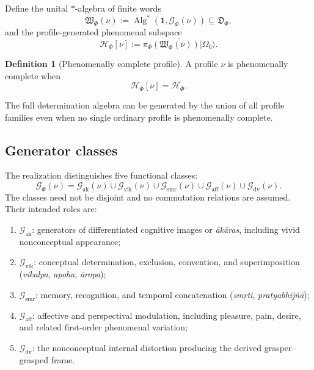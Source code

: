\documentclass[11pt,reqno]{scrartcl}
\newcommand{\scrHF}{\mathscr H_{\Phi}}
\newcommand{\piF}{\pi_{\Phi}}
\newcommand{\idop}{\mathbf 1}
\newcommand{\ket}[1]{\lvert #1\rangle}
\newcommand{\detAlg}{\mathfrak D_{\Phi}}
\newcommand{\vas}{\nu}
\newcommand{\genSet}{\mathcal G_{\Phi}}
\newcommand{\wordSet}{\mathfrak W_{\Phi}}
\newcommand{\Hvas}{\mathscr H_{\Phi}[\nu]}
\newcommand{\Gak}{\mathcal G_{\mathrm{ak}}}
\newcommand{\Gvik}{\mathcal G_{\mathrm{vik}}}
\newcommand{\Gsmr}{\mathcal G_{\mathrm{smr}}}
\newcommand{\Gaff}{\mathcal G_{\mathrm{aff}}}
\newcommand{\Gdv}{\mathcal G_{\mathrm{dv}}}
\DeclareMathOperator{\Alg}{Alg}
\theoremstyle{plain}
\theoremstyle{definition}
\newtheorem{definition}[definition]{Definition}
\theoremstyle{remark}
\begin{document}
Define the unital $*$-algebra of finite words
\begin{equation}
  \wordSet(\vas)
  :=\Alg^*\!\left(
      \idop,\genSet(\vas)
    \right)
  \subseteq\detAlg,
  \label{eq:vasana-word-algebra}
\end{equation}
and the profile-generated phenomenal subspace
\begin{equation}
  \boxed{
  \Hvas
  :=\overline{\piF(\wordSet(\vas))\ket{\Omega_0}}.}
  \label{eq:profile-generated-phenomenal-subspace}
\end{equation}

\begin{definition}[Phenomenally complete profile]
\label{def:phenomenally-complete-profile}
A profile $\vas$ is phenomenally complete when
\begin{equation}
  \Hvas=\scrHF.
  \label{eq:profile-completeness}
\end{equation}
\end{definition}

The full determination algebra can be generated by the union of all profile
families even when no single ordinary profile is phenomenally complete.

\subsection{Generator classes}

The realization distinguishes five functional classes:
\begin{equation}
  \boxed{
  \genSet(\vas)
  =\Gak(\vas)
   \cup\Gvik(\vas)
   \cup\Gsmr(\vas)
   \cup\Gaff(\vas)
   \cup\Gdv(\vas).}
  \label{eq:five-generator-classes}
\end{equation}
The classes need not be disjoint and no commutation relations are assumed.
Their intended roles are:
\begin{enumerate}[label=(\roman*)]
  \item $\Gak$: generators of differentiated cognitive images or
  \emph{\=ak\=aras}, including vivid nonconceptual appearance;
  \item $\Gvik$: conceptual determination, exclusion, convention, and
  superimposition (\emph{vikalpa}, \emph{apoha}, \emph{\=aropa});
  \item $\Gsmr$: memory, recognition, and temporal concatenation
  (\emph{sm\d{r}ti}, \emph{pratyabhij\~n\=a});
  \item $\Gaff$: affective and perspectival modulation, including pleasure,
  pain, desire, and related first-order phenomenal variation;
  \item $\Gdv$: the nonconceptual internal distortion producing the derived
  grasper--grasped frame.
\end{enumerate}
\end{document}
